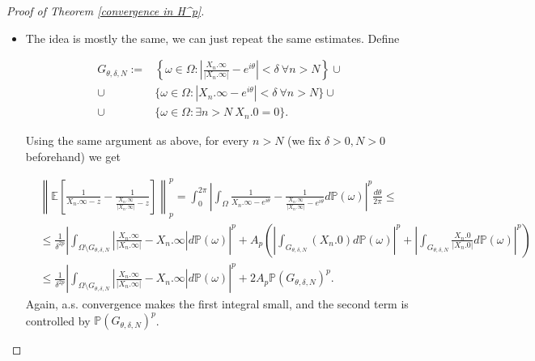 \documentclass[11pt]{article}
\begin{document}
\begin{proof}[Proof of Theorem \ref{convergence in H^p}]
\begin{itemize}
\[\begin{aligned}
			&\le \frac{1}{2^p\delta^{2p}}  \left( \int_{\Omega \setminus E_{\theta, \delta, N}} |X_\infty.\infty - X_n.\infty| d \mathbb{P}(\omega) \right)^p + A_p \left(  \left| \int_{E_{\theta, \delta, N}} (X_n.0) d \mathbb{P}(\omega) \right|^p + \left| \int_{E_{\theta, \delta, N}} (X_\infty.0) d \mathbb{P}(\omega) \right|^p \right) \le \\ & \le \frac{1}{2^p\delta^{2p}} \left( \int_{E_{\theta, \delta, N}} |X_\infty.\infty - X_n.\infty| d \mathbb{P}(\omega) \right)^p + 2 A_p \mathbb{P}(E_{\theta, \delta, N})^p
		\end{aligned}
		\]
		First of all, we choose such $\delta> 0$ and $N \in \mathbb{N}$ so that $\mathbb{P}(E_{\theta, \delta, N})^p$ is small enough, then we increase $N$ until the first integral becomes small.
		\item The idea is mostly the same, we can just repeat the same estimates. Define
		
		\[
		\begin{aligned}
			G_{\theta, \delta, N} := &\left\lbrace \omega \in \Omega : \left| \frac{X_n.\infty}{|X_n.\infty|} - e^{i \theta} \right| < \delta \ \forall n > N \right\rbrace \cup \\ \cup & \{ \omega \in \Omega : | X_n.\infty - e^{i \theta} | < \delta \ \forall n > N \} \cup \\ \cup & \{\omega \in \Omega : \exists n > N \  X_n.0 = 0 \}.
		\end{aligned}
		\]
		
		Using the same argument as above, for every $n > N$ (we fix $\delta > 0, N > 0$ beforehand) we get
		
		\[
		\begin{aligned}
			& \left\| \mathbb{E} \left[\frac{1}{X_n.\infty - z} - \frac{1}{\frac{X_n.\infty}{|X_n.\infty|} - z}\right] \right\|_p^p = \int_0^{2 \pi} \left| \int_{\Omega} \frac{1}{X_n.\infty - e^{i \theta}} - \frac{1}{\frac{X_n.\infty}{|X_n.\infty|} - e^{i \theta}} d \mathbb{P}(\omega) \right|^p \frac{d \theta}{2 \pi} \le \\ 
			&\le \frac{1}{\delta^{2 p}} \left| \int_{\Omega \setminus G_{\theta, \delta, N}} \left|\frac{X_n.\infty}{|X_n.\infty|} - X_n.\infty \right| d \mathbb{P}(\omega) \right|^p + A_p \left(  \left| \int_{G_{\theta, \delta, N}} (X_n.0) d \mathbb{P}(\omega) \right|^p + \left| \int_{G_{\theta, \delta, N}} \frac{X_n.0}{|X_n.0|} d \mathbb{P}(\omega) \right|^p \right) \\ 
			& \le \frac{1}{\delta^{2 p}} \left| \int_{\Omega \setminus G_{\theta, \delta, N}} \left|\frac{X_n.\infty}{|X_n.\infty|} - X_n.\infty \right| d \mathbb{P}(\omega) \right|^p + 2 A_p \mathbb{P}(G_{\theta, \delta, N})^p.
		\end{aligned}
		\]
		Again, a.s. convergence makes the first integral small, and the second term is controlled by $\mathbb{P}(G_{\theta, \delta, N})^p$.
	\end{itemize}
\end{proof}
\end{document}
